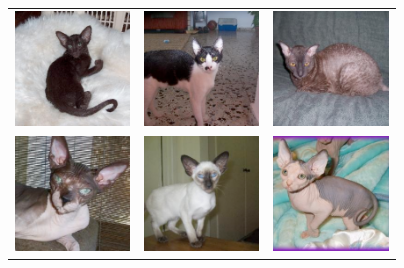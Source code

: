 \documentclass[aspectratio=169]{beamer}
\begin{document}
\begin{frame}
\frametitle{}
\begin{center}
\begin{tabular}{ccc}
\includegraphics[width=1.2in]{figures/kittenwar_ugly_1} & \includegraphics[width=1.2in]{figures/kittenwar_ugly_2} & \includegraphics[width=1.2in]{figures/kittenwar_ugly_3}\\
\includegraphics[width=1.2in]{figures/kittenwar_ugly_4} & \includegraphics[width=1.2in]{figures/kittenwar_ugly_5} & \includegraphics[width=1.2in]{figures/kittenwar_ugly_6}
\end{tabular}
\end{center}
\end{frame}
\end{document}
